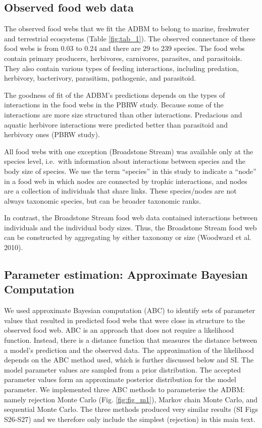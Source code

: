 \documentclass{article}
\begin{document}
\hypertarget{observed-food-web-data}{%
\subsection{Observed food web data}\label{observed-food-web-data}}

The observed food webs that we fit the ADBM to belong to marine,
freshwater and terrestrial ecosystems (Table \ref{fig:tab_1}). The
observed connectance of these food webs is from 0.03 to 0.24 and there
are 29 to 239 species. The food webs contain primary producers,
herbivores, carnivores, parasites, and parasitoids. They also contain
various types of feeding interactions, including predation, herbivory,
bacterivory, parasitism, pathogenic, and parasitoid.

The goodness of fit of the ADBM's predictions depends on the types of
interactions in the food webs in the PBRW study. Because some of the
interactions are more size structured than other interactions.
Predacious and aquatic herbivore interactions were predicted better than
parasitoid and herbivory ones (PBRW study).

All food webs with one exception (Broadstone Stream) was available only
at the species level, i.e.~with information about interactions between
species and the body size of species. We use the term ``species'' in
this study to indicate a ``node'' in a food web in which nodes are
connected by trophic interactions, and nodes are a collection of
individuals that share links. These species/nodes are not always
taxonomic species, but can be broader taxonomic ranks.

In contrast, the Broadstone Stream food web data contained interactions
between individuals and the individual body sizes. Thus, the Broadstone
Stream food web can be constructed by aggregating by either taxonomy or
size (Woodward et al. 2010).

\hypertarget{parameter-estimation-approximate-bayesian-computation}{%
\subsection{Parameter estimation: Approximate Bayesian
Computation}\label{parameter-estimation-approximate-bayesian-computation}}

We used approximate Bayesian computation (ABC) to identify sets of
parameter values that resulted in predicted food webs that were close in
structure to the observed food web. ABC is an approach that does not
require a likelihood function. Instead, there is a distance function
that measures the distance between a model's prediction and the observed
data. The approximation of the likelihood depends on the ABC method
used, which is further discussed below and SI. The model parameter
values are sampled from a prior distribution. The accepted parameter
values form an approximate posterior distribution for the model
parameter. We implemented three ABC methods to parameterise the ADBM:
namely rejection Monte Carlo (Fig. \ref{fig:fig_m1}), Markov chain Monte
Carlo, and sequential Monte Carlo. The three methods produced very
similar results (SI Figs S26-S27) and we therefore only include the
simplest (rejection) in this main text.
\end{document}
